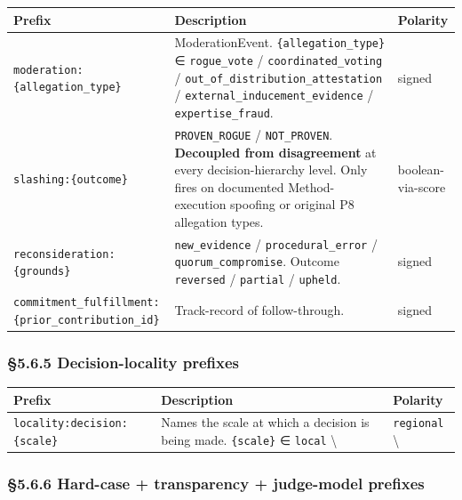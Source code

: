 \documentclass[11pt]{article}
\begin{document}
{\footnotesize
\begin{longtable}{|p{5.33cm}|p{5.33cm}|p{5.33cm}|}\hline
\textbf{Prefix} & \textbf{Description} & \textbf{Polarity} \\ \hline\endhead
\texttt{moderation:\{allegation\_type\}} & ModerationEvent. \texttt{\{allegation\_type\}} ∈ \texttt{rogue\_vote} / \texttt{coordinated\_voting} / \texttt{out\_of\_distribution\_attestation} / \texttt{external\_inducement\_evidence} / \texttt{expertise\_fraud}. & signed \\ \hline
\texttt{slashing:\{outcome\}} & \texttt{PROVEN\_ROGUE} / \texttt{NOT\_PROVEN}. \textbf{Decoupled from disagreement} at every decision-hierarchy level. Only fires on documented Method-execution spoofing or original P8 allegation types. & boolean-via-score \\ \hline
\texttt{reconsideration:\{grounds\}} & \texttt{new\_evidence} / \texttt{procedural\_error} / \texttt{quorum\_compromise}. Outcome \texttt{reversed} / \texttt{partial} / \texttt{upheld}. & signed \\ \hline
\texttt{commitment\_fulfillment:\{prior\_contribution\_id\}} & Track-record of follow-through. & signed \\ \hline
\end{longtable}}


\subsubsection*{§5.6.5 Decision-locality prefixes}


{\footnotesize
\begin{longtable}{|p{5.33cm}|p{5.33cm}|p{5.33cm}|}\hline
\textbf{Prefix} & \textbf{Description} & \textbf{Polarity} \\ \hline\endhead
\texttt{locality:decision:\{scale\}} & Names the scale at which a decision is being made. \texttt{\{scale\}} ∈ \texttt{local} \textbackslash{} & \texttt{regional} \textbackslash{} \\ \hline
\end{longtable}}


\subsubsection*{§5.6.6 Hard-case + transparency + judge-model prefixes}
\end{document}
